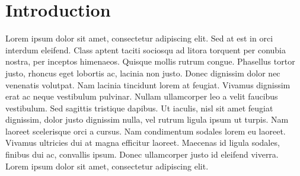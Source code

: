 \section{Introduction}\label{introduction}

Lorem ipsum dolor sit amet, consectetur adipiscing elit. Sed at est in
orci interdum eleifend. Class aptent taciti sociosqu ad litora torquent
per conubia nostra, per inceptos himenaeos. Quisque mollis rutrum
congue. Phasellus tortor justo, rhoncus eget lobortis ac, lacinia non
justo. Donec dignissim dolor nec venenatis volutpat. Nam lacinia
tincidunt lorem at feugiat. Vivamus dignissim erat ac neque vestibulum
pulvinar. Nullam ullamcorper leo a velit faucibus vestibulum. Sed
sagittis tristique dapibus. Ut iaculis, nisl sit amet feugiat dignissim,
dolor justo dignissim nulla, vel rutrum ligula ipsum ut turpis. Nam
laoreet scelerisque orci a cursus. Nam condimentum sodales lorem eu
laoreet. Vivamus ultricies dui at magna efficitur laoreet. Maecenas id
ligula sodales, finibus dui ac, convallis ipsum. Donec ullamcorper justo
id eleifend viverra. Lorem ipsum dolor sit amet, consectetur adipiscing
elit.
